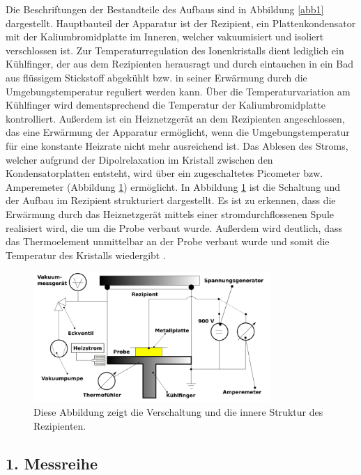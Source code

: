 Die Beschriftungen der Bestandteile des Aufbaus sind in Abbildung \ref{abb1} dargestellt.
Hauptbauteil der Apparatur ist der Rezipient, ein Plattenkondensator mit der Kaliumbromidplatte
im Inneren, welcher vakuumisiert und isoliert verschlossen ist. 
Zur Temperaturregulation des Ionenkristalls dient lediglich ein Kühlfinger, 
der aus dem Rezipienten herausragt und durch eintauchen in ein Bad aus flüssigem 
Stickstoff abgekühlt bzw. in seiner Erwärmung durch die Umgebungstemperatur reguliert 
werden kann. Über die Temperaturvariation am Kühlfinger wird dementsprechend die 
Temperatur der Kaliumbromidplatte kontrolliert. 
Außerdem ist ein Heiznetzgerät an dem Rezipienten angeschlossen, das eine Erwärmung 
der Apparatur ermöglicht, wenn die Umgebungstemperatur für eine konstante 
Heizrate nicht mehr ausreichend ist. 
Das Ablesen des Stroms, welcher aufgrund der Dipolrelaxation im Kristall zwischen 
den Kondensatorplatten entsteht, wird über ein zugeschaltetes Picometer 
bzw. Amperemeter (Abbildung \ref{abb2}) ermöglicht.
In Abbildung \ref{abb2} ist die Schaltung und der Aufbau im Rezipient strukturiert 
dargestellt. Es ist zu erkennen, dass die Erwärmung durch das Heiznetzgerät 
mittels einer stromdurchflossenen Spule realisiert wird, die um die Probe
verbaut wurde. Außerdem wird deutlich, dass das Thermoelement unmittelbar an 
der Probe verbaut wurde und somit die Temperatur des Kristalls wiedergibt \cite{sample}. 

\begin{figure}
    \centering
    \includegraphics[width=0.8\textwidth, keepaspectratio]{figure/AufbauSkizze.png}
    \caption{Diese Abbildung zeigt die Verschaltung und die innere Struktur 
    des Rezipienten. 
    \cite{sample}}
    \label{abb2}
\end{figure}

\subsection{1. Messreihe}

